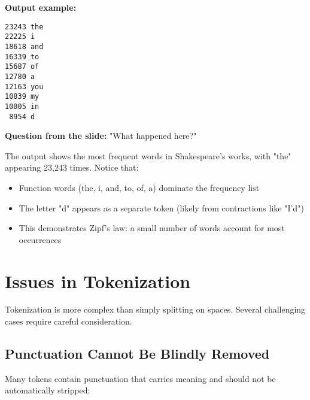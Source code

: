 \documentclass[11pt,a4paper]{article}
\theoremstyle{definition}
\theoremstyle{plain}
\theoremstyle{remark}
\begin{document}
\textbf{Output example:}
\begin{verbatim}
23243 the
22225 i
18618 and
16339 to
15687 of
12780 a
12163 you
10839 my
10005 in
 8954 d
\end{verbatim}

\textbf{Question from the slide:} "What happened here?"

The output shows the most frequent words in Shakespeare's works, with "the" appearing 23,243 times. Notice that:
\begin{itemize}
    \item Function words (the, i, and, to, of, a) dominate the frequency list
    \item The letter "d" appears as a separate token (likely from contractions like "I'd")
    \item This demonstrates Zipf's law: a small number of words account for most occurrences
\end{itemize}

\section{Issues in Tokenization}

Tokenization is more complex than simply splitting on spaces. Several challenging cases require careful consideration.

\subsection{Punctuation Cannot Be Blindly Removed}

Many tokens contain punctuation that carries meaning and should not be automatically stripped:
\end{document}
